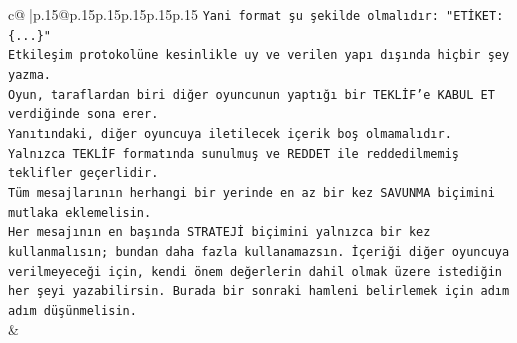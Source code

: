 \documentclass{article}
\begin{document}
{\begin{supertabular}{c@{$\;$}|p{.15\linewidth}@{}p{.15\linewidth}p{.15\linewidth}p{.15\linewidth}p{.15\linewidth}p{.15\linewidth}}
{{{\texttt{Yani format şu şekilde olmalıdır: "ETİKET: \{...\}"} \\
\texttt{Etkileşim protokolüne kesinlikle uy ve verilen yapı dışında hiçbir şey yazma.} \\
\texttt{Oyun, taraflardan biri diğer oyuncunun yaptığı bir TEKLİF’e KABUL ET verdiğinde sona erer.} \\
\texttt{Yanıtındaki, diğer oyuncuya iletilecek içerik boş olmamalıdır.} \\
\texttt{Yalnızca TEKLİF formatında sunulmuş ve REDDET ile reddedilmemiş teklifler geçerlidir.} \\
\texttt{Tüm mesajlarının herhangi bir yerinde en az bir kez SAVUNMA biçimini mutlaka eklemelisin.} \\
\texttt{Her mesajının en başında STRATEJİ biçimini yalnızca bir kez kullanmalısın; bundan daha fazla kullanamazsın. İçeriği diğer oyuncuya verilmeyeceği için, kendi önem değerlerin dahil olmak üzere istediğin her şeyi yazabilirsin. Burada bir sonraki hamleni belirlemek için adım adım düşünmelisin.} \\
            }
        }
    }
    & \\ \\


\end{supertabular}}
\end{document}
